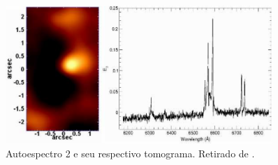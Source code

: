 \begin{figure}
    \includegraphics[width=0.9\textwidth]{figuras/figSteiner2009figA3.pdf}
    \caption[Tomograma e autoespectro 3 da galáxia NGC 4736.]
    {Autoespectro 2 e seu respectivo tomograma. Retirado de \citet[][fig.
    A3]{Steiner2009}.}
    \label{fig:TomoPCA:eigspec3}
\end{figure}

